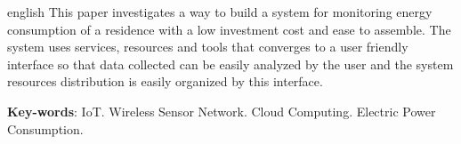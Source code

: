 \begin{resumo}[Abstract]
 \begin{otherlanguage*}{english}
   This paper investigates a way to build a system for monitoring energy consumption of a residence with a low investment cost and ease to assemble. The system uses services, resources and tools that converges to a user friendly interface so that data collected can be easily analyzed by the user and the system resources distribution is easily organized by this interface.

   \vspace{\onelineskip}
 
   \noindent 
   \textbf{Key-words}: IoT. Wireless Sensor Network. Cloud Computing. Electric Power Consumption.
 \end{otherlanguage*}
\end{resumo}